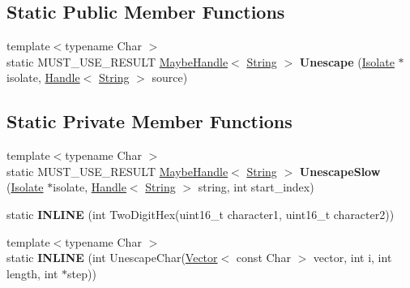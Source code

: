 \subsection*{Static Public Member Functions}
\begin{DoxyCompactItemize}
\item 
{\footnotesize template$<$typename Char $>$ }\\static M\+U\+S\+T\+\_\+\+U\+S\+E\+\_\+\+R\+E\+S\+U\+LT \hyperlink{classv8_1_1internal_1_1_maybe_handle}{Maybe\+Handle}$<$ \hyperlink{classv8_1_1internal_1_1_string}{String} $>$ {\bfseries Unescape} (\hyperlink{classv8_1_1internal_1_1_isolate}{Isolate} $\ast$isolate, \hyperlink{classv8_1_1internal_1_1_handle}{Handle}$<$ \hyperlink{classv8_1_1internal_1_1_string}{String} $>$ source)\hypertarget{classv8_1_1internal_1_1_u_r_i_unescape_aab4a31857b6e317d77e1137c5dc95f28}{}\label{classv8_1_1internal_1_1_u_r_i_unescape_aab4a31857b6e317d77e1137c5dc95f28}

\end{DoxyCompactItemize}
\subsection*{Static Private Member Functions}
\begin{DoxyCompactItemize}
\item 
{\footnotesize template$<$typename Char $>$ }\\static M\+U\+S\+T\+\_\+\+U\+S\+E\+\_\+\+R\+E\+S\+U\+LT \hyperlink{classv8_1_1internal_1_1_maybe_handle}{Maybe\+Handle}$<$ \hyperlink{classv8_1_1internal_1_1_string}{String} $>$ {\bfseries Unescape\+Slow} (\hyperlink{classv8_1_1internal_1_1_isolate}{Isolate} $\ast$isolate, \hyperlink{classv8_1_1internal_1_1_handle}{Handle}$<$ \hyperlink{classv8_1_1internal_1_1_string}{String} $>$ string, int start\+\_\+index)\hypertarget{classv8_1_1internal_1_1_u_r_i_unescape_ab2c6cf5c3845b8a64b276a0c78417db8}{}\label{classv8_1_1internal_1_1_u_r_i_unescape_ab2c6cf5c3845b8a64b276a0c78417db8}

\item 
static {\bfseries I\+N\+L\+I\+NE} (int Two\+Digit\+Hex(uint16\+\_\+t character1, uint16\+\_\+t character2))\hypertarget{classv8_1_1internal_1_1_u_r_i_unescape_a02bc25815062ec07fff7ec502c133b90}{}\label{classv8_1_1internal_1_1_u_r_i_unescape_a02bc25815062ec07fff7ec502c133b90}

\item 
{\footnotesize template$<$typename Char $>$ }\\static {\bfseries I\+N\+L\+I\+NE} (int Unescape\+Char(\hyperlink{classv8_1_1internal_1_1_vector}{Vector}$<$ const Char $>$ vector, int i, int length,                                                                                                                           int $\ast$step))\hypertarget{classv8_1_1internal_1_1_u_r_i_unescape_ac96fa5c393ac6b3e9b3764bbe0230b28}{}\label{classv8_1_1internal_1_1_u_r_i_unescape_ac96fa5c393ac6b3e9b3764bbe0230b28}

\end{DoxyCompactItemize}
